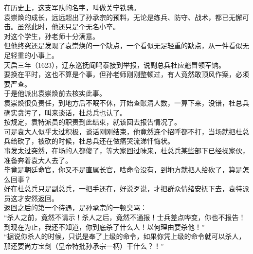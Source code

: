 \begin{multicols}{\theparacolNo}
在历史上，这支军队的名字，叫做关宁铁骑。\\

袁崇焕的成长，远远超出了孙承宗的预料，无论是练兵、防守、战术，都已无懈可击。虽然此时，他还只是个无名小卒。\\

对这个学生，孙老师十分满意。\\

但他终究还是发现了袁崇焕的一个缺点，一个看似无足轻重的缺点，从一件看似无足轻重的小事上。\\

天启三年（1623），辽东巡抚阎鸣泰接到举报，说副总兵杜应魁冒领军饷。\\

要换在平时，这也不算是个事，但孙老师刚刚整顿过，有人竟然敢顶风作案，必须要严查。\\

于是他派出袁崇焕前去核实此事。\\

袁崇焕很负责任，到地方后不眠不休，开始查账清人数，一算下来，没错，杜总兵确实贪污了，叫来谈话，杜总兵也认了。\\

按规定，袁特派员的职责到此结束，就该回去报告情况了。\\

可是袁大人似乎太过积极，谈话刚刚结束，他竟然连个招呼都不打，当场就把杜总兵给砍了，被砍的时候，杜总兵还在做痛哭流涕忏悔状。\\

事发太过突然，在场的人都傻了，等大家回过味来，杜总兵某些部下已经操家伙，准备奔着袁大人去了。\\

毕竟是朝廷命官，你又不是直属长官，啥命令没有，到地方就把人给砍了，算是怎么回事？\\

好在杜总兵只是副总兵，一把手还在，好说歹说，才把群众情绪安抚下去，袁特派员这才安然返回。\\

返回之后的第一个待遇，是孙承宗的一顿臭骂：\\

“杀人之前，竟然不请示！杀人之后，竟然不通报！士兵差点哗变，你也不报告！到现在为止，我还不知道，你到底杀了什么人！以何理由要杀他！”\\

“据说你杀人的时候，只说是奉了上级的命令，如果你凭上级的命令就可以杀人，那还要尚方宝剑（皇帝特批孙承宗一柄）干什么？！”\\


\end{multicols}
